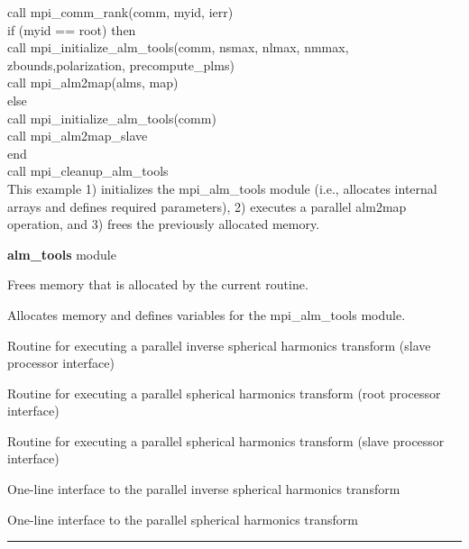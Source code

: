 \begin{example}
{
call mpi\_comm\_rank(comm, myid, ierr)\\
if (myid == root) then\\
\hspace*{1cm}call mpi\_initialize\_alm\_tools(comm, nsmax, nlmax, nmmax, \\
\hspace*{3cm}zbounds,polarization, precompute\_plms)\\
\hspace*{1cm}call mpi\_alm2map(alms, map)\\
else \\
\hspace*{1cm}call mpi\_initialize\_alm\_tools(comm)\\
\hspace*{1cm}call mpi\_alm2map\_slave\\
end\\
call mpi\_cleanup\_alm\_tools\\
}
{
This example 1) initializes the mpi\_alm\_tools module (i.e.,
allocates internal arrays and defines required parameters), 2)
executes a parallel alm2map operation, and 3) frees the previously
allocated memory.
}
\end{example}

\begin{modules}
  \begin{sulist}{} %
  \item[\textbf{alm\_tools}] module
  \end{sulist}
\end{modules}

\begin{related}
  \begin{sulist}{} %
   \item[\htmlref{mpi\_cleanup\_alm\_tools}{sub:mpi_cleanup_alm_tools}] Frees memory that is allocated by the current routine. 
   \item[\htmlref{mpi\_initialize\_alm\_tools}{sub:mpi_initialize_alm_tools}] Allocates memory and defines variables for the mpi\_alm\_tools module. 
  \item[\htmlref{mpi\_alm2map\_slave}{sub:mpi_alm2map_slave}] Routine for executing a parallel inverse spherical harmonics transform (slave processor interface)
  \item[\htmlref{mpi\_map2alm}{sub:mpi_map2alm}] Routine for executing a parallel spherical harmonics transform (root processor interface)
  \item[\htmlref{mpi\_map2alm\_slave}{sub:mpi_map2alm_slave}] Routine for executing a parallel spherical harmonics transform (slave processor interface)
  \item[\htmlref{mpi\_alm2map\_simple}{sub:mpi_alm2map_simple}] One-line interface to the parallel inverse spherical harmonics transform 
  \item[\htmlref{mpi\_map2alm\_simple}{sub:mpi_map2alm_simple}] One-line interface to the parallel spherical harmonics transform 
  \end{sulist}
\end{related}

\rule{\hsize}{2mm}

\newpage
